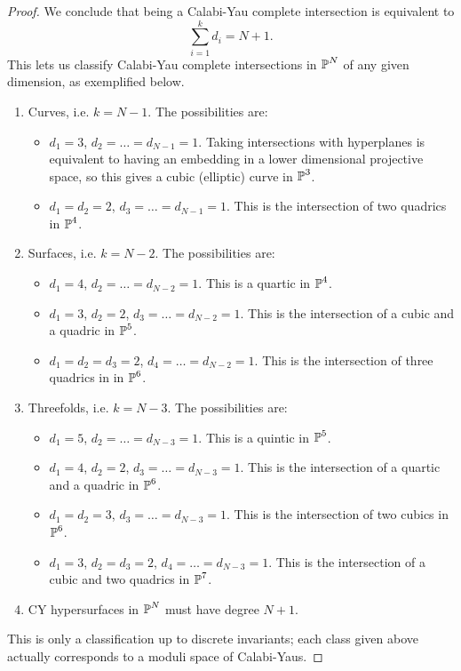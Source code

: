 \documentclass{article}
\begin{document}
\begin{proof}
We conclude that being a Calabi-Yau complete intersection is equivalent to 
\begin{equation}
\label{eq:CY}
\sum_{i=1}^k d_i = N+1.
\end{equation}
 This lets us
classify Calabi-Yau complete intersections in $\operatorname{\mathbb{P}}^N$ of any given dimension, as exemplified below.
\begin{enumerate}
\item Curves, i.e. $k = N-1$. The possibilities are:
\begin{itemize}
\item $d_1 = 3$, $d_2 = \dots = d_{N-1} = 1$. Taking intersections with hyperplanes is equivalent to having an
embedding in a lower dimensional projective space, so this gives a cubic (elliptic) curve in $\operatorname{\mathbb{P}}^3$.
\item $d_1 = d_2 = 2$, $d_3 = \dots = d_{N-1} = 1$. This is the intersection of two quadrics in $\operatorname{\mathbb{P}}^4$.
\end{itemize}
\item Surfaces, i.e. $k = N-2$. The possibilities are:
\begin{itemize}
\item $d_1 = 4$, $d_2 = \dots = d_{N-2} = 1$. This is a quartic in $\operatorname{\mathbb{P}}^4$.
\item $d_1 = 3$, $d_2 = 2$, $d_3 = \dots = d_{N-2} = 1$. This is the intersection of a cubic and a quadric
in $\operatorname{\mathbb{P}}^5$.
\item $d_1 = d_2 = d_3 = 2$, $d_4 = \dots = d_{N-2} = 1$. This is the intersection of three quadrics in
in $\operatorname{\mathbb{P}}^6$.
\end{itemize}
\item Threefolds, i.e. $k = N-3$. The possibilities are:
\begin{itemize}
\item $d_1 = 5$, $d_2 = \dots = d_{N-3} = 1$. This is a quintic in $\operatorname{\mathbb{P}}^5$.
\item $d_1 = 4$, $d_2 = 2$, $d_3 = \dots = d_{N-3} = 1$. This is the intersection of a quartic and a quadric in
$\operatorname{\mathbb{P}}^6$.
\item $d_1 =d_2 = 3$, $d_3 = \dots = d_{N-3} = 1$. This is the intersection of two cubics in $\operatorname{\mathbb{P}}^6$.
\item $d_1 =3$, $d_2 = d_3 = 2$, $d_4 = \dots = d_{N-3} = 1$. This is the intersection of a cubic and two quadrics
in $\operatorname{\mathbb{P}}^7$.
\end{itemize}
\item CY hypersurfaces in $\operatorname{\mathbb{P}}^N$ must have degree $N+1$.
\end{enumerate}
This is only a classification up to discrete invariants; each class given above actually corresponds to a moduli
space of Calabi-Yaus.
\end{proof}
\end{document}
